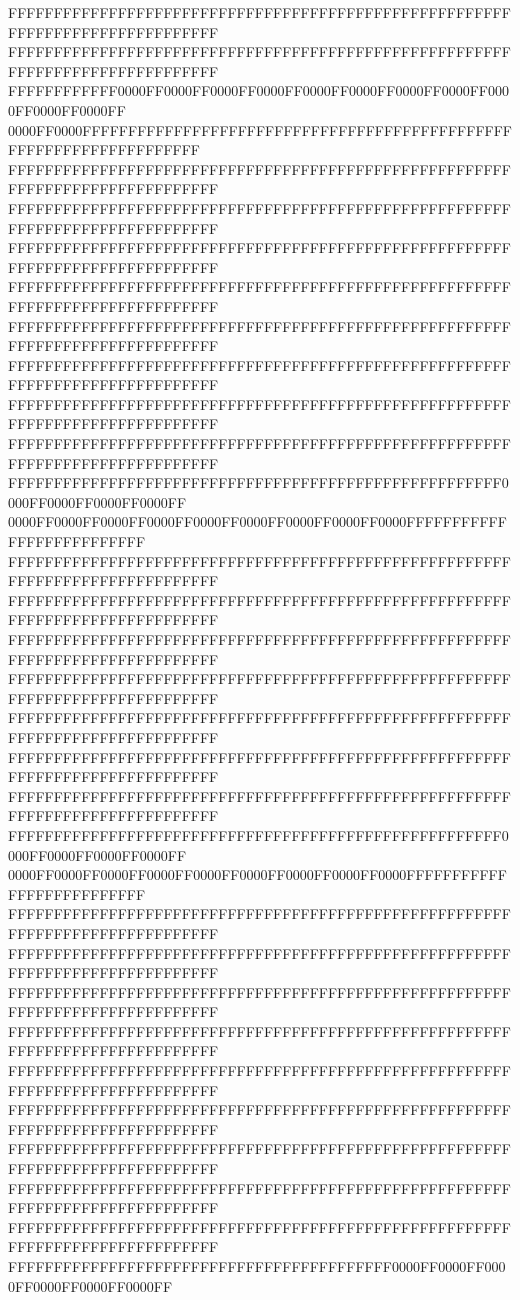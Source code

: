 FFFFFFFFFFFFFFFFFFFFFFFFFFFFFFFFFFFFFFFFFFFFFFFFFFFFFFFFFFFFFFFFFFFFFFFFFFFFFF
FFFFFFFFFFFFFFFFFFFFFFFFFFFFFFFFFFFFFFFFFFFFFFFFFFFFFFFFFFFFFFFFFFFFFFFFFFFFFF
FFFFFFFFFFFF0000FF0000FF0000FF0000FF0000FF0000FF0000FF0000FF0000FF0000FF0000FF
0000FF0000FFFFFFFFFFFFFFFFFFFFFFFFFFFFFFFFFFFFFFFFFFFFFFFFFFFFFFFFFFFFFFFFFFFF
FFFFFFFFFFFFFFFFFFFFFFFFFFFFFFFFFFFFFFFFFFFFFFFFFFFFFFFFFFFFFFFFFFFFFFFFFFFFFF
FFFFFFFFFFFFFFFFFFFFFFFFFFFFFFFFFFFFFFFFFFFFFFFFFFFFFFFFFFFFFFFFFFFFFFFFFFFFFF
FFFFFFFFFFFFFFFFFFFFFFFFFFFFFFFFFFFFFFFFFFFFFFFFFFFFFFFFFFFFFFFFFFFFFFFFFFFFFF
FFFFFFFFFFFFFFFFFFFFFFFFFFFFFFFFFFFFFFFFFFFFFFFFFFFFFFFFFFFFFFFFFFFFFFFFFFFFFF
FFFFFFFFFFFFFFFFFFFFFFFFFFFFFFFFFFFFFFFFFFFFFFFFFFFFFFFFFFFFFFFFFFFFFFFFFFFFFF
FFFFFFFFFFFFFFFFFFFFFFFFFFFFFFFFFFFFFFFFFFFFFFFFFFFFFFFFFFFFFFFFFFFFFFFFFFFFFF
FFFFFFFFFFFFFFFFFFFFFFFFFFFFFFFFFFFFFFFFFFFFFFFFFFFFFFFFFFFFFFFFFFFFFFFFFFFFFF
FFFFFFFFFFFFFFFFFFFFFFFFFFFFFFFFFFFFFFFFFFFFFFFFFFFFFFFFFFFFFFFFFFFFFFFFFFFFFF
FFFFFFFFFFFFFFFFFFFFFFFFFFFFFFFFFFFFFFFFFFFFFFFFFFFFFF0000FF0000FF0000FF0000FF
0000FF0000FF0000FF0000FF0000FF0000FF0000FF0000FF0000FFFFFFFFFFFFFFFFFFFFFFFFFF
FFFFFFFFFFFFFFFFFFFFFFFFFFFFFFFFFFFFFFFFFFFFFFFFFFFFFFFFFFFFFFFFFFFFFFFFFFFFFF
FFFFFFFFFFFFFFFFFFFFFFFFFFFFFFFFFFFFFFFFFFFFFFFFFFFFFFFFFFFFFFFFFFFFFFFFFFFFFF
FFFFFFFFFFFFFFFFFFFFFFFFFFFFFFFFFFFFFFFFFFFFFFFFFFFFFFFFFFFFFFFFFFFFFFFFFFFFFF
FFFFFFFFFFFFFFFFFFFFFFFFFFFFFFFFFFFFFFFFFFFFFFFFFFFFFFFFFFFFFFFFFFFFFFFFFFFFFF
FFFFFFFFFFFFFFFFFFFFFFFFFFFFFFFFFFFFFFFFFFFFFFFFFFFFFFFFFFFFFFFFFFFFFFFFFFFFFF
FFFFFFFFFFFFFFFFFFFFFFFFFFFFFFFFFFFFFFFFFFFFFFFFFFFFFFFFFFFFFFFFFFFFFFFFFFFFFF
FFFFFFFFFFFFFFFFFFFFFFFFFFFFFFFFFFFFFFFFFFFFFFFFFFFFFFFFFFFFFFFFFFFFFFFFFFFFFF
FFFFFFFFFFFFFFFFFFFFFFFFFFFFFFFFFFFFFFFFFFFFFFFFFFFFFF0000FF0000FF0000FF0000FF
0000FF0000FF0000FF0000FF0000FF0000FF0000FF0000FF0000FFFFFFFFFFFFFFFFFFFFFFFFFF
FFFFFFFFFFFFFFFFFFFFFFFFFFFFFFFFFFFFFFFFFFFFFFFFFFFFFFFFFFFFFFFFFFFFFFFFFFFFFF
FFFFFFFFFFFFFFFFFFFFFFFFFFFFFFFFFFFFFFFFFFFFFFFFFFFFFFFFFFFFFFFFFFFFFFFFFFFFFF
FFFFFFFFFFFFFFFFFFFFFFFFFFFFFFFFFFFFFFFFFFFFFFFFFFFFFFFFFFFFFFFFFFFFFFFFFFFFFF
FFFFFFFFFFFFFFFFFFFFFFFFFFFFFFFFFFFFFFFFFFFFFFFFFFFFFFFFFFFFFFFFFFFFFFFFFFFFFF
FFFFFFFFFFFFFFFFFFFFFFFFFFFFFFFFFFFFFFFFFFFFFFFFFFFFFFFFFFFFFFFFFFFFFFFFFFFFFF
FFFFFFFFFFFFFFFFFFFFFFFFFFFFFFFFFFFFFFFFFFFFFFFFFFFFFFFFFFFFFFFFFFFFFFFFFFFFFF
FFFFFFFFFFFFFFFFFFFFFFFFFFFFFFFFFFFFFFFFFFFFFFFFFFFFFFFFFFFFFFFFFFFFFFFFFFFFFF
FFFFFFFFFFFFFFFFFFFFFFFFFFFFFFFFFFFFFFFFFFFFFFFFFFFFFFFFFFFFFFFFFFFFFFFFFFFFFF
FFFFFFFFFFFFFFFFFFFFFFFFFFFFFFFFFFFFFFFFFFFFFFFFFFFFFFFFFFFFFFFFFFFFFFFFFFFFFF
FFFFFFFFFFFFFFFFFFFFFFFFFFFFFFFFFFFFFFFFFF0000FF0000FF0000FF0000FF0000FF0000FF
